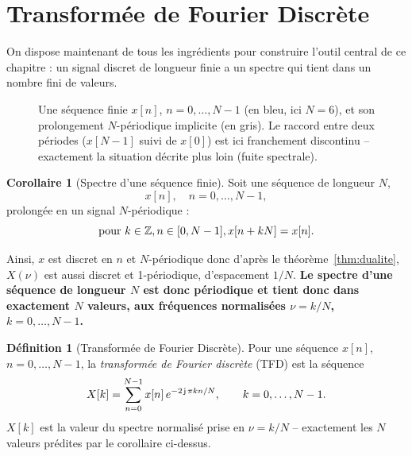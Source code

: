 \documentclass[a4paper,11pt]{article}
\theoremstyle{definition}
\newtheorem{definition}{Définition}[section]
\newtheorem{corollary}{Corollaire}[section]
\newcommand{\highlight}[1]{{\color{niceblue}\emph{#1}}}
\begin{document}
\section{Transformée de Fourier Discrète}

On dispose maintenant de tous les ingrédients pour construire l'outil
central de ce chapitre : un signal discret de longueur finie a un
spectre qui tient dans un nombre fini de valeurs.

\begin{figure}[h]
    \centering
    \caption{Une séquence finie $x[n]$, $n=0,\dots,N-1$ (en bleu, ici $N=6$), et son prolongement $N$-périodique implicite (en gris). Le raccord entre deux périodes ($x[N-1]$ suivi de $x[0]$) est ici franchement discontinu -- exactement la situation décrite plus loin (fuite spectrale).}
    \label{fig:sequence-finie}
\end{figure}

\begin{corollary}[Spectre d'une séquence finie]
    Soit une séquence de longueur $N$, $$x[n], \quad  n=0,\dots,N-1,$$ 
    prolongée en un signal $N$-périodique : 
    $$\text{pour} \ k\in{\mathbb{Z}}, n\in[0,N-1], x[n + kN] = x[n].$$
    
    Ainsi, $x$ est discret en $n$ et $N$-périodique donc d'après le théorème~\ref{thm:dualite}, 
    $X(\nu)$ est aussi discret et 1-périodique, d'espacement $1/N$.
    \textbf{Le spectre d'une séquence de longueur $N$ est donc périodique et tient donc dans exactement
    $N$ valeurs, aux fréquences normalisées $\nu=k/N$, $k=0,\dots,N-1$.}
\end{corollary}

\begin{definition}[Transformée de Fourier Discrète]
    Pour une séquence $x[n]$, $n=0,\dots,N-1$, la
    \highlight{transformée de Fourier discrète} (TFD) est la séquence
    $$
        X[k] = \sum_{n=0}^{N-1} x[n]\,e^{-2\operatorname{\mathsf{j}}\pi kn/N}, \qquad k=0,\dots,N-1.
    $$
    $X[k]$ est la valeur du spectre normalisé prise en $\nu=k/N$ --
    exactement les $N$ valeurs prédites par le corollaire ci-dessus.
\end{definition}
\end{document}
